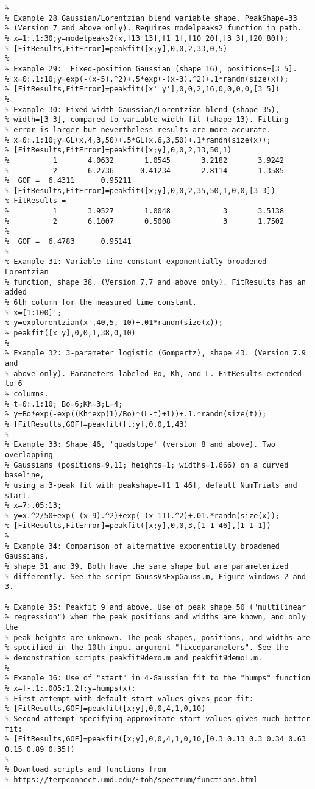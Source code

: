 \begin{lstlisting}
%
% Example 28 Gaussian/Lorentzian blend variable shape, PeakShape=33
% (Version 7 and above only). Requires modelpeaks2 function in path.
% x=1:.1:30;y=modelpeaks2(x,[13 13],[1 1],[10 20],[3 3],[20 80]);
% [FitResults,FitError]=peakfit([x;y],0,0,2,33,0,5)
%
% Example 29:  Fixed-position Gaussian (shape 16), positions=[3 5]. 
% x=0:.1:10;y=exp(-(x-5).^2)+.5*exp(-(x-3).^2)+.1*randn(size(x));
% [FitResults,FitError]=peakfit([x' y'],0,0,2,16,0,0,0,0,[3 5])
%
% Example 30: Fixed-width Gaussian/Lorentzian blend (shape 35), 
% width=[3 3], compared to variable-width fit (shape 13). Fitting
% error is larger but nevertheless results are more accurate.
% x=0:.1:10;y=GL(x,4,3,50)+.5*GL(x,6,3,50)+.1*randn(size(x));
% [FitResults,FitError]=peakfit([x;y],0,0,2,13,50,1)
%          1       4.0632       1.0545       3.2182       3.9242
%          2       6.2736      0.41234       2.8114       1.3585
%  GOF =  6.4311      0.95211 
% [FitResults,FitError]=peakfit([x;y],0,0,2,35,50,1,0,0,[3 3])
% FitResults =
%          1       3.9527       1.0048            3       3.5138
%          2       6.1007       0.5008            3       1.7502
% 
%  GOF =  6.4783      0.95141
%
% Example 31: Variable time constant exponentially-broadened Lorentzian
% function, shape 38. (Version 7.7 and above only). FitResults has an added
% 6th column for the measured time constant.
% x=[1:100]';
% y=explorentzian(x',40,5,-10)+.01*randn(size(x));
% peakfit([x y],0,0,1,38,0,10)
%
% Example 32: 3-parameter logistic (Gompertz), shape 43. (Version 7.9 and
% above only). Parameters labeled Bo, Kh, and L. FitResults extended to 6
% columns. 
% t=0:.1:10; Bo=6;Kh=3;L=4;
% y=Bo*exp(-exp((Kh*exp(1)/Bo)*(L-t)+1))+.1.*randn(size(t));
% [FitResults,GOF]=peakfit([t;y],0,0,1,43)
%
% Example 33: Shape 46, 'quadslope' (version 8 and above). Two overlapping
% Gaussians (positions=9,11; heights=1; widths=1.666) on a curved baseline,
% using a 3-peak fit with peakshape=[1 1 46], default NumTrials and start.
% x=7:.05:13;
% y=x.^2/50+exp(-(x-9).^2)+exp(-(x-11).^2)+.01.*randn(size(x));
% [FitResults,FitError]=peakfit([x;y],0,0,3,[1 1 46],[1 1 1])
%
% Example 34: Comparison of alternative exponentially broadened Gaussians,
% shape 31 and 39. Both have the same shape but are parameterized
% differently. See the script GaussVsExpGauss.m, Figure windows 2 and 3.

% Example 35: Peakfit 9 and above. Use of peak shape 50 ("multilinear
% regression") when the peak positions and widths are known, and only the
% peak heights are unknown. The peak shapes, positions, and widths are
% specified in the 10th input argument "fixedparameters". See the
% demonstration scripts peakfit9demo.m and peakfit9demoL.m.
% 
% Example 36: Use of "start" in 4-Gaussian fit to the "humps" function
% x=[-.1:.005:1.2];y=humps(x);
% First attempt with default start values gives poor fit:
% [FitResults,GOF]=peakfit([x;y],0,0,4,1,0,10)
% Second attempt specifying approximate start values gives much better fit:
% [FitResults,GOF]=peakfit([x;y],0,0,4,1,0,10,[0.3 0.13 0.3 0.34 0.63 0.15 0.89 0.35])
%
% Download scripts and functions from 
% https://terpconnect.umd.edu/~toh/spectrum/functions.html


\end{lstlisting}

